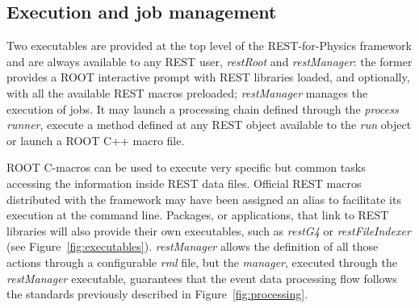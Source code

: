 

\subsection{Execution and job management}
Two executables are provided at the top level of the REST-for-Physics framework and are always available to any REST user, \emph{restRoot} and \emph{restManager}: the former provides a ROOT interactive prompt with REST libraries loaded, and optionally, with all the available REST macros preloaded; \emph{restManager} manages the execution of jobs. It may launch a processing chain defined through the \emph{process runner}, execute a method defined at any REST object available to the \emph{run} object or launch a ROOT C++ macro file. 

ROOT C-macros can be used to execute very specific but common tasks accessing the information inside REST data files. Official REST macros distributed with the framework may have been assigned an alias to facilitate its execution at the command line. Packages, or applications, that link to REST libraries will also provide their own executables, such as \emph{restG4} or \emph{restFileIndexer}  (see Figure~\ref{fig:executables}). \emph{restManager} allows the definition of all those actions through a configurable \emph{rml} file, but the \emph{manager}, executed through the \emph{restManager} executable, guarantees that the event data processing flow follows the standards previously described in Figure~\ref{fig:processing}.

